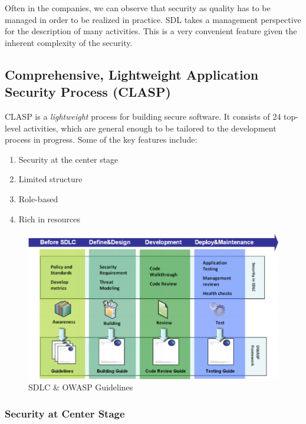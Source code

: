 \documentclass[12pt,a4,twoside]{article}
\begin{document}
Often in the companies, we can observe that security as quality has to be managed in order to be realized in practice. SDL takes a management perspective for the description of many activities. This is a very convenient feature given the inherent complexity of the security.

\subsection{Comprehensive, Lightweight Application Security Process (CLASP) \cite{on_secure_software}}

CLASP is a \textit{lightweight} process for building secure software. It consists of 24 top-level activities, which are general enough to be tailored to the development process in progress. Some of the key features include:

\begin{enumerate}
    \item Security at the center stage
    \item Limited structure
    \item Role-based
    \item Rich in resources
\end{enumerate}

\begin{figure}[h]
\centering
\includegraphics[width=1\textwidth]{figures/owasp_clasp.png}
\caption{SDLC \& OWASP Guidelines \cite{owasp_clasp}}
\label{fig:sdlc_owasp}
\end{figure}

\subsubsection{Security at Center Stage}
\end{document}
